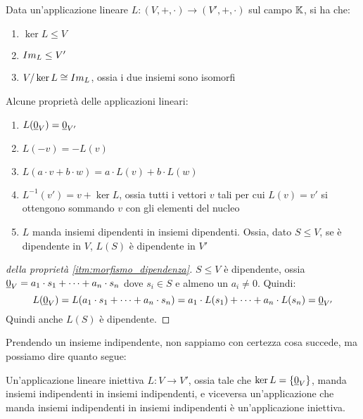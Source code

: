 \begin{theorem}
Data un'applicazione lineare $L : (V, +, \cdot) \to (V', +, \cdot)$ sul campo $\mathbb{K}$, si ha che:
\begin{enumerate}
    \item $\ker L \le V$
    \item $Im_{L} \le V'$
    \item $V / \ker L \cong Im_{L}$, ossia i due insiemi sono isomorfi
\end{enumerate}
\end{theorem}
Alcune propriet\`a delle applicazioni lineari:
\begin{enumerate}
    \item $L(\underline{0}_V) = \underline{0}_{V'}$
    \item $L(-v) = - L(v)$
    \item $L(a \cdot v + b \cdot w) = a \cdot L(v) + b \cdot L(w)$
    \item $L^{-1} (v') = v + \ker L$, ossia tutti i vettori $v$ tali per cui $L(v) = v'$ si ottengono sommando $v$ con gli elementi del nucleo
    \item\label{itm:morfismo_dipendenza} $L$ manda insiemi dipendenti in insiemi dipendenti. Ossia, dato $S \le V$, se \`e dipendente in $V$, $L(S)$ \`e dipendente in $V'$
\end{enumerate}
\begin{proof}[della propriet\`a \ref{itm:morfismo_dipendenza}]
$S \le V$ \`e dipendente, ossia $\underline{0}_V = a_1 \cdot s_1 + \dots + a_n \cdot s_n$ dove $s_i \in S$ e almeno un $a_i \neq 0$. Quindi:
\[
L(\underline{0}_V) = L(a_1 \cdot s_1 + \dots + a_n \cdot s_n) = a_1 \cdot L(s_1) + \dots + a_n \cdot L(s_n) = \underline{0}_{V'}
\]
Quindi anche $L(S)$ \`e dipendente.
\end{proof}
Prendendo un insieme indipendente, non sappiamo con certezza cosa succede, ma possiamo dire quanto segue:
\begin{prop}
Un'applicazione lineare iniettiva $L : V \to V'$, ossia tale che $\ker L = \{ \underline{0}_{V} \}$, manda insiemi indipendenti in insiemi indipendenti, e viceversa un'applicazione che manda insiemi indipendenti in insiemi indipendenti \`e un'applicazione iniettiva.
\end{prop}
